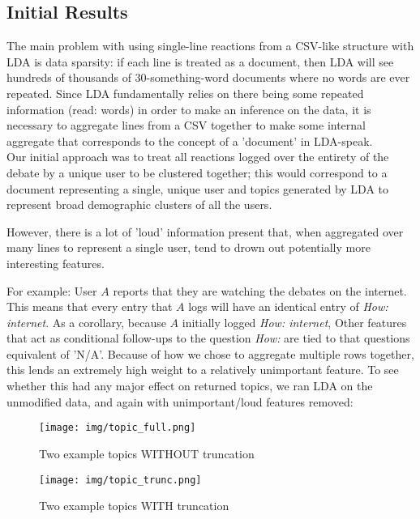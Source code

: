 \subsection{Initial Results}
The main problem with using single-line reactions from a CSV-like structure with LDA is data sparsity: if each line is treated as a document, then LDA will see hundreds of thousands of 30-something-word documents where no words are ever repeated. Since LDA fundamentally relies on there being some repeated information (read: words) in order to make an inference on the data, it is necessary to aggregate lines from a CSV together to make some internal aggregate that corresponds to the concept of a 'document' in LDA-speak.\\

Our initial approach was to treat all reactions logged over the entirety of the debate by a unique user to be clustered together; this would correspond to a document representing a single, unique user and topics generated by LDA to represent broad demographic clusters of all the users.

However, there is a lot of 'loud' information present that, when aggregated over many lines to represent a single user, tend to drown out potentially more interesting features.

For example: User $A$ reports that they are watching the debates on the internet. This means that every entry that $A$ logs will have an identical entry of \emph{How: internet}. As a corollary, because $A$ initially logged \emph{How: internet}, Other features that act as conditional follow-ups to the question \emph{How: } are tied to that questions equivalent of 'N/A'. Because of how we chose to aggregate multiple rows together, this lends an extremely high weight to a relatively unimportant feature. To see whether this had any major effect on returned topics, we ran LDA on the unmodified data, and again with unimportant/loud features removed:\\

\begin{figure}[H]
\centering
\texttt{[image: img/topic\_full.png]}
\caption{Two example topics WITHOUT truncation}
\texttt{[image: img/topic\_trunc.png]}
\caption{Two example topics WITH truncation}
\end{figure}


